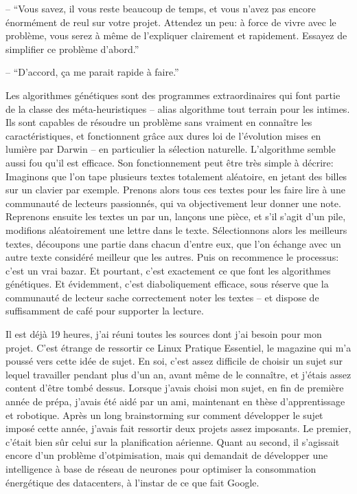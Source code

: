 \documentclass[letterpaper, 12pt]{article} %
\begin{document}
{-- ``Vous savez, il vous reste beaucoup de temps, et vous n'avez pas encore énormément de reul sur votre projet.
		Attendez un peu: à force de vivre avec le problème, vous serez à même de l'expliquer clairement et rapidement.
		Essayez de simplifier ce problème d'abord.''

-- ``D'accord, ça me parait rapide à faire.''


Les algorithmes génétiques sont des programmes extraordinaires qui font partie de la classe des méta-heuristiques -- alias algorithme tout terrain pour les intimes. 
Ils sont capables de résoudre un problème sans vraiment en connaître les caractéristiques, et fonctionnent grâce aux dures loi de l'évolution mises en lumière par Darwin -- en particulier la sélection naturelle. 
L'algorithme semble aussi fou qu'il est efficace.
Son fonctionnement peut être très simple à décrire: 
Imaginons que l'on tape plusieurs textes totalement aléatoire, en jetant des billes sur un clavier par exemple.
Prenons alors tous ces textes pour les faire lire à une communauté de lecteurs passionnés, qui va objectivement leur donner une note.
Reprenons ensuite les textes un par un, lançons une pièce, et s'il s'agit d'un pile, modifions aléatoirement une lettre dans le texte.
Sélectionnons alors les meilleurs textes, découpons une partie dans chacun d'entre eux, que l'on échange avec un autre texte considéré meilleur que les autres.
Puis on recommence le processus: c'est un vrai bazar. 
Et pourtant, c'est exactement ce que font les algorithmes génétiques.
Et évidemment, c'est diaboliquement efficace, sous réserve que la communauté de lecteur sache correctement noter les textes -- et dispose de suffisamment de café pour supporter la lecture.

Il est déjà 19 heures, j'ai réuni toutes les sources dont j'ai besoin pour mon projet. 
C'est étrange de ressortir ce Linux Pratique Essentiel, le magazine qui m'a poussé vers cette idée de sujet. 
En soi, c'est assez difficile de choisir un sujet sur lequel travailler pendant plus d'un an, avant même de le connaître,
et j'étais assez content d'être tombé dessus.
Lorsque j'avais choisi mon sujet, en fin de première année de prépa, j'avais été aidé par un ami, maintenant en thèse d'apprentissage et robotique.
Après un long brainstorming sur comment développer le sujet imposé cette année, j'avais fait ressortir deux projets assez imposants.
Le premier, c'était bien sûr celui sur la planification aérienne. 
Quant au second, il s'agissait encore d'un problème d'otpimisation, mais qui demandait de développer une intelligence à base de réseau de neurones pour optimiser la consommation énergétique des datacenters, à l'instar de ce que fait Google.

}
\end{document}
